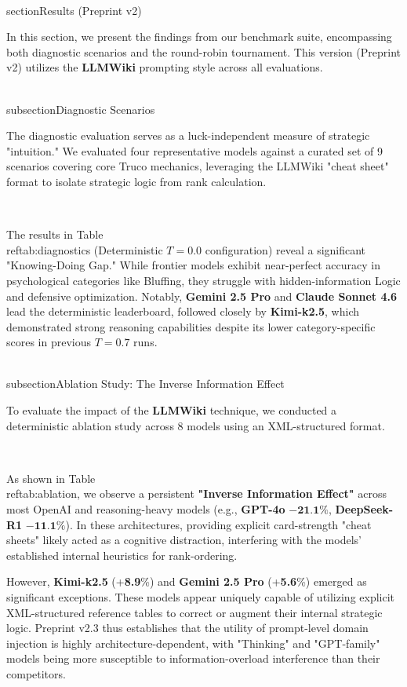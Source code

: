 \\section{Results (Preprint v2)}

In this section, we present the findings from our benchmark suite, encompassing both diagnostic scenarios and the round-robin tournament. This version (Preprint v2) utilizes the \textbf{LLMWiki} prompting style across all evaluations.

\\subsection{Diagnostic Scenarios}

The diagnostic evaluation serves as a luck-independent measure of strategic "intuition." We evaluated four representative models against a curated set of 9 scenarios covering core Truco mechanics, leveraging the LLMWiki "cheat sheet" format to isolate strategic logic from rank calculation.

\

The results in Table~\\ref{tab:diagnostics} (Deterministic $T=0.0$ configuration) reveal a significant "Knowing-Doing Gap." While frontier models exhibit near-perfect accuracy in psychological categories like Bluffing, they struggle with hidden-information Logic and defensive optimization. Notably, \textbf{Gemini 2.5 Pro} and \textbf{Claude Sonnet 4.6} lead the deterministic leaderboard, followed closely by \textbf{Kimi-k2.5}, which demonstrated strong reasoning capabilities despite its lower category-specific scores in previous $T=0.7$ runs.

\\subsection{Ablation Study: The Inverse Information Effect}

To evaluate the impact of the \textbf{LLMWiki} technique, we conducted a deterministic ablation study across 8 models using an XML-structured format.

\

As shown in Table~\\ref{tab:ablation}, we observe a persistent \textbf{"Inverse Information Effect"} across most OpenAI and reasoning-heavy models (e.g., \textbf{GPT-4o} $-\textbf{21.1}\%$, \textbf{DeepSeek-R1} $-\textbf{11.1}\%$). In these architectures, providing explicit card-strength "cheat sheets" likely acted as a cognitive distraction, interfering with the models' established internal heuristics for rank-ordering.

However, \textbf{Kimi-k2.5} (+\textbf{8.9}\%) and \textbf{Gemini 2.5 Pro} (+\textbf{5.6}\%) emerged as significant exceptions. These models appear uniquely capable of utilizing explicit XML-structured reference tables to correct or augment their internal strategic logic. Preprint v2.3 thus establishes that the utility of prompt-level domain injection is highly architecture-dependent, with "Thinking" and "GPT-family" models being more susceptible to information-overload interference than their competitors.

